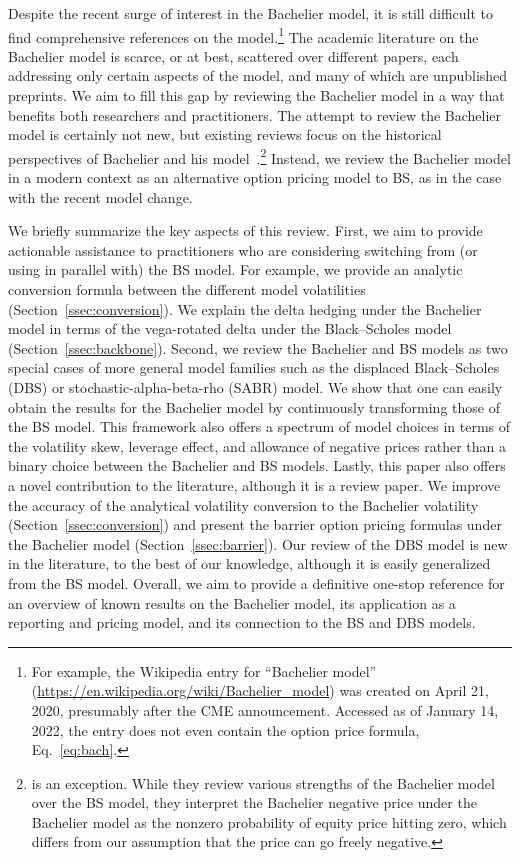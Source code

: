 \documentclass[a4paper,review]{elsarticle}
\begin{document}
Despite the recent surge of interest in the Bachelier model, it is still difficult to find comprehensive references on the model.\footnote{For example, the Wikipedia entry for ``Bachelier model'' (\url{https://en.wikipedia.org/wiki/Bachelier_model}) was created on April 21, 2020, presumably after the CME announcement. Accessed as of January 14, 2022, the entry does not even contain the option price formula, Eq.~\eqref{eq:bach}.} The academic literature on the Bachelier model is scarce, or at best, scattered over different papers, each addressing only certain aspects of the model, and many of which are unpublished preprints. We aim to fill this gap by reviewing the Bachelier model in a way that benefits both researchers and practitioners. The attempt to review the Bachelier model is certainly not new, but existing reviews focus on the historical perspectives of Bachelier and his model~\citep{sullivan1991louis,courtault2000louis,schachermayer2008close}.\footnote{\citet{brooks2017arithmetic} is an exception. While they review various strengths of the Bachelier model over the BS model, they interpret the Bachelier negative price under the Bachelier model as the nonzero probability of equity price hitting zero, which differs from our assumption that the price can go freely negative.} 
Instead, we review the Bachelier model in a modern context as an alternative option pricing model to BS, as in the case with the recent model change.

We briefly summarize the key aspects of this review. First, we aim to provide actionable assistance to practitioners who are considering switching from (or using in parallel with) the BS model. For example, we provide an analytic conversion formula between the different model volatilities (Section~\ref{ssec:conversion}). We explain the delta hedging under the Bachelier model in terms of the vega-rotated delta under the Black--Scholes model (Section~\ref{ssec:backbone}). Second, we review the Bachelier and BS models as two special cases of more general model families such as the displaced Black--Scholes (DBS) or stochastic-alpha-beta-rho (SABR) model. We show that one can easily obtain the results for the Bachelier model by continuously transforming those of the BS model. This framework also offers a spectrum of model choices in terms of the volatility skew, leverage effect, and allowance of negative prices rather than a binary choice between the Bachelier and BS models. Lastly, this paper also offers a novel contribution to the literature, although it is a review paper. We improve the accuracy of the analytical volatility conversion to the Bachelier volatility (Section~\ref{ssec:conversion}) and present the barrier option pricing formulas under the Bachelier model (Section~\ref{ssec:barrier}). Our review of the DBS model is new in the literature, to the best of our knowledge, although it is easily generalized from the BS model. Overall, we aim to provide a definitive one-stop reference for an overview of known results on the Bachelier model, its application as a reporting and pricing model, and its connection to the BS and DBS models.
\end{document}
